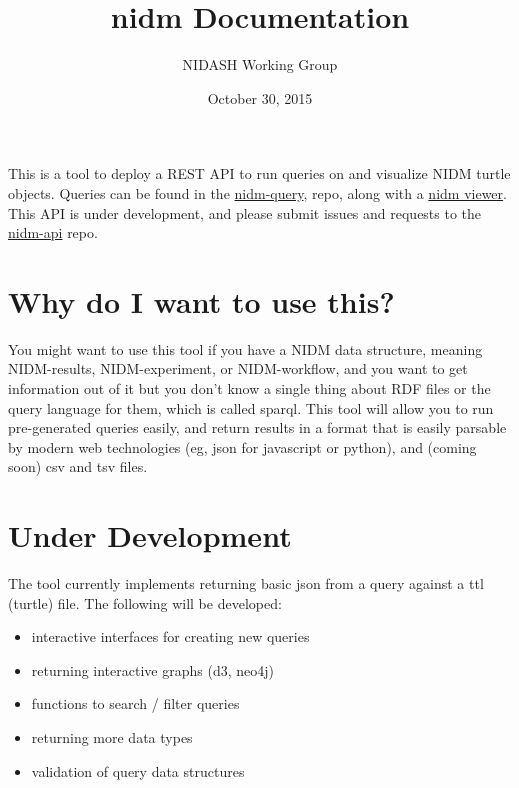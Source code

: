 \documentclass[letterpaper,10pt,english]{sphinxmanual}
\title{nidm Documentation}
\date{October 30, 2015}
\author{NIDASH Working Group}
\begin{document}
\maketitle
\tableofcontents
{}\label{index::doc}


This is a tool to deploy a REST API to run queries on and visualize NIDM turtle objects. Queries can be found in the \href{https://github.com/incf-nidash/nidm-query}{nidm-query}, repo, along with a \href{https://github.com/vsoch/nidmviewer}{nidm viewer}.  This API is under development, and please submit issues and requests to the \href{https://github.com/incf-nidash/nidm-api/issues}{nidm-api} repo.


\chapter{Why do I want to use this?}
\label{index:nidm-api}\label{index:why-do-i-want-to-use-this}
You might want to use this tool if you have a NIDM data structure, meaning NIDM-results, NIDM-experiment, or NIDM-workflow, and you want to get information out of it but you don't know a single thing about RDF files or the query language for them, which is called sparql. This tool will allow you to run pre-generated queries easily, and return results in a format that is easily parsable by modern web technologies (eg, json for javascript or python), and (coming soon) csv and tsv files.


\chapter{Under Development}
\label{index:under-development}
The tool currently implements returning basic json from a query against a ttl (turtle) file. The following will be developed:
\begin{itemize}
\item {} 
interactive interfaces for creating new queries

\item {} 
returning interactive graphs (d3, neo4j)

\item {} 
functions to search / filter queries

\item {} 
returning more data types

\item {} 
validation of query data structures

\end{itemize}
\end{document}
